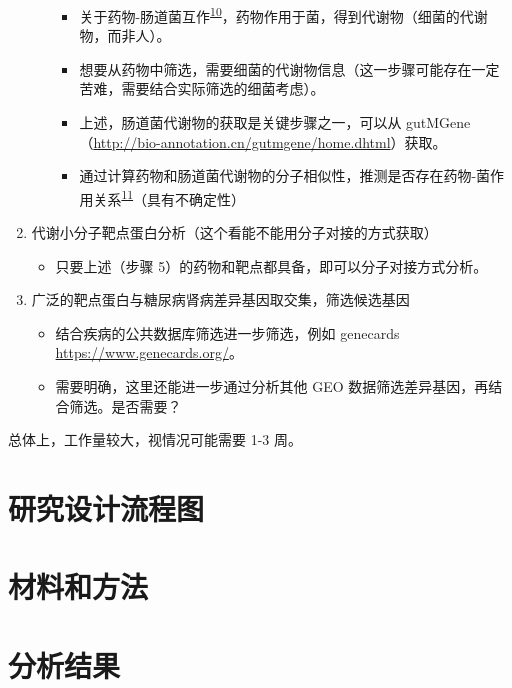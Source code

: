 \documentclass[
]{article}
\providecommand{\tightlist}{%
  \setlength{\itemsep}{0pt}\setlength{\parskip}{0pt}}
\begin{document}
\begin{enumerate}
\begin{itemize}
    \begin{itemize}
    \tightlist
    \item
      关于药物-肠道菌互作\textsuperscript{\protect\hyperlink{ref-PersonalizedMaJavdan2020}{10}}，药物作用于菌，得到代谢物（细菌的代谢物，而非人）。
    \item
      想要从药物中筛选，需要细菌的代谢物信息（这一步骤可能存在一定苦难，需要结合实际筛选的细菌考虑）。
    \item
      上述，肠道菌代谢物的获取是关键步骤之一，可以从 gutMGene（\url{http://bio-annotation.cn/gutmgene/home.dhtml}）获取。
    \item
      通过计算药物和肠道菌代谢物的分子相似性，推测是否存在药物-菌作用关系\textsuperscript{\protect\hyperlink{ref-MolecularSimilGandin2022}{11}}（具有不确定性）
    \end{itemize}
  \end{itemize}
\item
  代谢小分子靶点蛋白分析（这个看能不能用分子对接的方式获取）

  \begin{itemize}
  \tightlist
  \item
    只要上述（步骤 5）的药物和靶点都具备，即可以分子对接方式分析。
  \end{itemize}
\item
  广泛的靶点蛋白与糖尿病肾病差异基因取交集，筛选候选基因

  \begin{itemize}
  \tightlist
  \item
    结合疾病的公共数据库筛选进一步筛选，例如 genecards \url{https://www.genecards.org/}。
  \item
    需要明确，这里还能进一步通过分析其他 GEO 数据筛选差异基因，再结合筛选。是否需要？
  \end{itemize}
\end{enumerate}

总体上，工作量较大，视情况可能需要 1-3 周。

\hypertarget{route}{%
\section{研究设计流程图}\label{route}}

\hypertarget{methods}{%
\section{材料和方法}\label{methods}}

\hypertarget{results}{%
\section{分析结果}\label{results}}
\end{document}
